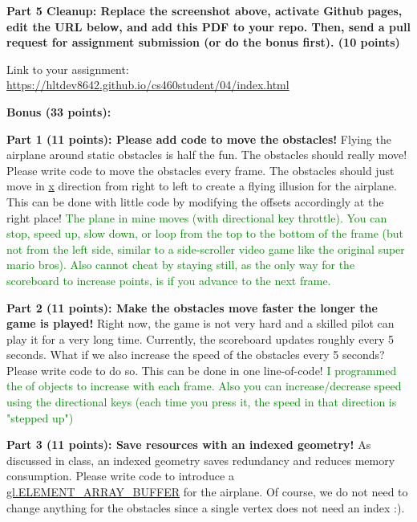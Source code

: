 \documentclass[10pt,oneside,onecolumn,letterpaper]{article}
\begin{document}
\vspace{.5cm}

\noindent\textbf{Part 5 Cleanup: Replace the screenshot above, activate Github pages, edit the URL below, and add this PDF to your repo. Then, send a pull request for assignment submission (or do the bonus first). (10 points)}

\vspace{.5cm}

Link to your assignment: \url{https://hltdev8642.github.io/cs460student/04/index.html}


\clearpage
\noindent\textbf{Bonus (33 points):}


\vspace{.5cm} %

\noindent\textbf{Part 1 (11 points): Please add code to move the obstacles!} Flying the airplane around static obstacles is half the fun. The obstacles should really move! Please write code to move the obstacles every frame. The obstacles should just move in \url{x} direction from right to left to create a flying illusion for the airplane. This can be done with little code by modifying the offsets accordingly at the right place!
\newline
\textcolor{green}{The plane in mine moves (with directional key throttle). You can stop, speed up, slow down, or loop from the top to the bottom of the frame (but not from the left side, similar to a side-scroller video game like the original super mario bros). Also cannot cheat by staying still, as the only way for the scoreboard to increase points, is if you advance to the next frame.}

\vspace{1cm}

\noindent \textbf{Part 2 (11 points): Make the obstacles move faster the longer the game is played!} Right now, the game is not very hard and a skilled pilot can play it for a very long time. Currently, the scoreboard updates roughly every 5 seconds. What if we also increase the speed of the obstacles every 5 seconds? Please write code to do so. This can be done in one line-of-code!
\newline
\textcolor{green}{I programmed the of objects to increase with each frame. Also you can increase/decrease speed using the directional keys (each time you press it, the speed in that direction is "stepped up")}

\vspace{1cm}

\noindent \textbf{Part 3 (11 points): Save resources with an indexed geometry!} As discussed in class, an indexed geometry saves redundancy and reduces memory consumption. Please write code to introduce a \url{gl.ELEMENT_ARRAY_BUFFER} for the airplane. Of course, we do not need to change anything for the obstacles since a single vertex does not need an index :).
\end{document}

